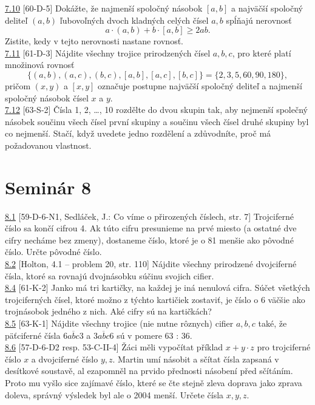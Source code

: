 \noindent \ul{7.10} [60-D-5]
Dokážte, že najmenší spoločný násobok $[a, b]$ a najväčší spoločný deliteľ $(a, b)$ ľubovoľných dvoch kladných celých čísel $a, b$ spĺňajú nerovnosť
$$a \cdot (a, b) + b \cdot [a, b] \geq 2ab.$$
Zistite, kedy v tejto nerovnosti nastane rovnosť.\\

\noindent \ul{7.11} [61-D-3]
Nájdite všechny trojice prirodzených čísel $a, b, c$, pro které platí množinová rovnosť
$$\{(a, b), (a, c), (b, c), [a, b], [a, c], [b, c]\}= \{2, 3, 5, 60, 90, 180\},$$
pričom $(x, y)$ a $[x, y]$ označuje postupne najväčší spoločný deliteľ a najmenší spoločný násobok čísel $x$ a $y$.\\

\noindent \ul{7.12} [63-S-2] Čísla 1, 2, \ldots , 10 rozdělte do dvou skupin
tak, aby nejmenší společný násobek součinu všech čísel první skupiny a součinu
všech čísel druhé skupiny byl co nejmenší. Stačí, když uvedete jedno rozdělení a
zdůvodníte, proč má požadovanou vlastnost.\\

\section*{Seminár 8}

\noindent \ul{8.1} [59-D-6-N1, Sedláček, J.: Co víme o přirozených číslech, str. 7] Trojciferné číslo sa končí cifrou 4. Ak túto cifru presunieme na prvé miesto (a ostatné dve cifry necháme bez zmeny), dostaneme číslo, ktoré je o 81 menšie ako pôvodné číslo. Určte pôvodné číslo.\\

\noindent \ul{8.2} [Holton, 4.1 -- problem 20, str. 110] Nájdite všechny prirodzené dvojciferné čísla, ktoré sa rovnajú dvojnásobku súčinu svojich cifier.\\

\noindent \ul{8.4} [61-K-2] Janko má tri kartičky, na každej je iná nenulová cifra. Súčet všetkých trojciferných čísel, ktoré možno z týchto kartičiek zostaviť, je číslo o 6 väčšie ako trojnásobok jedného z nich. Aké cifry sú na kartičkách?\\

\noindent \ul{8.5} [63-K-1]
Nájdite všechny trojice (nie nutne rôznych) cifier $a, b, c$ také, že päťciferné čísla $\overline{6abc3}$ a $\overline{3abc6}$ sú v pomere 63 : 36.\\

\noindent \ul{8.6} [57-D-6-D2 resp. 53-C-II-4]  Žáci měli vypočítat příklad $x + y \cdot z$ pro
trojciferné číslo $x$ a dvojciferné číslo $y, z$. Martin umí násobit a sčítat čísla zapsaná v
desítkové soustavě, al ezapomněl na prvido přednosti násobení před sčítáním. Proto mu vyšlo sice
zajímavé číslo, které se čte stejně zleva doprava jako zprava doleva, správný výsledek byl ale o
2004 menší. Určete čísla $x, y, z$.\\

